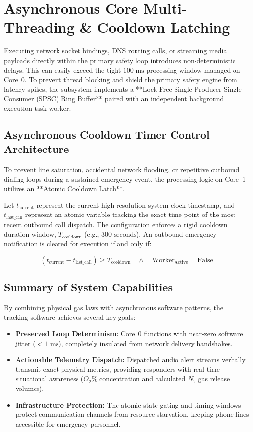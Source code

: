 \documentclass[../master.tex]{subfiles}
\begin{document}
\section{Asynchronous Core Multi-Threading \& Cooldown Latching}
Executing network socket bindings, DNS routing calls, or streaming media payloads directly within the primary safety loop introduces non-deterministic delays. This can easily exceed the tight $100\text{ ms}$ processing window managed on Core~0. To prevent thread blocking and shield the primary safety engine from latency spikes, the subsystem implements a **Lock-Free Single-Producer Single-Consumer (SPSC) Ring Buffer** paired with an independent background execution task worker.

\subsection{Asynchronous Cooldown Timer Control Architecture}
To prevent line saturation, accidental network flooding, or repetitive outbound dialing loops during a sustained emergency event, the processing logic on Core~1 utilizes an **Atomic Cooldown Latch**. 

Let $t_{\text{current}}$ represent the current high-resolution system clock timestamp, and $t_{\text{last\_call}}$ represent an atomic variable tracking the exact time point of the most recent outbound call dispatch. The configuration enforces a rigid cooldown duration window, $T_{\text{cooldown}}$ (e.g., $300\text{ seconds}$). An outbound emergency notification is cleared for execution if and only if:

\begin{equation}
    (t_{\text{current}} - t_{\text{last\_call}}) \ge T_{\text{cooldown}} \quad \land \quad \text{Worker}_{\text{Active}} = \text{False}
\end{equation}

\subsection{Summary of System Capabilities}
By combining physical gas laws with asynchronous software patterns, the tracking software achieves several key goals:
\begin{itemize}
    \item \textbf{Preserved Loop Determinism:} Core~0 functions with near-zero software jitter ($<1\text{ ms}$), completely insulated from network delivery handshakes.
    \item \textbf{Actionable Telemetry Dispatch:} Dispatched audio alert streams verbally transmit exact physical metrics, providing responders with real-time situational awareness ($O_2\%$ concentration and calculated $N_2$ gas release volumes).
    \item \textbf{Infrastructure Protection:} The atomic state gating and timing windows protect communication channels from resource starvation, keeping phone lines accessible for emergency personnel.
\end{itemize}

\nocite{nfpa72_2022, twilio_compliance_2024}


\end{document}
